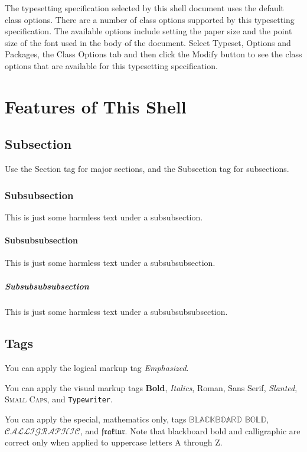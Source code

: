 \documentclass{article}
\begin{document}
The typesetting specification selected by this shell document uses the
default class options. There are a number of class options supported by this
typesetting specification. The available options include setting the paper
size and the point size of the font used in the body of the document. Select 
\textsf{Typeset, Options and Packages}, the \textsf{Class Options} tab and
then click the \textsf{Modify} button to see the class options that are
available for this typesetting specification.

\section{Features of This Shell}

\subsection{Subsection}

Use the Section tag for major sections, and the Subsection tag for
subsections.

\subsubsection{Subsubsection}

This is just some harmless text under a subsubsection.

\paragraph{Subsubsubsection}

This is just some harmless text under a subsubsubsection.

\subparagraph{Subsubsubsubsection}

This is just some harmless text under a subsubsubsubsection.

\subsection{Tags}

You can apply the logical markup tag \emph{Emphasized}.

You can apply the visual markup tags \textbf{Bold}, \textit{Italics}, 
\textrm{Roman}, \textsf{Sans Serif}, \textsl{Slanted}, \textsc{Small Caps},
and \texttt{Typewriter}.

You can apply the special, mathematics only, tags $\mathbb{BLACKBOARD}$ $%
\mathbb{BOLD}$, $\mathcal{CALLIGRAPHIC}$, and $\mathfrak{fraktur}$. Note
that blackboard bold and calligraphic are correct only when applied to
uppercase letters A through Z.
\end{document}
